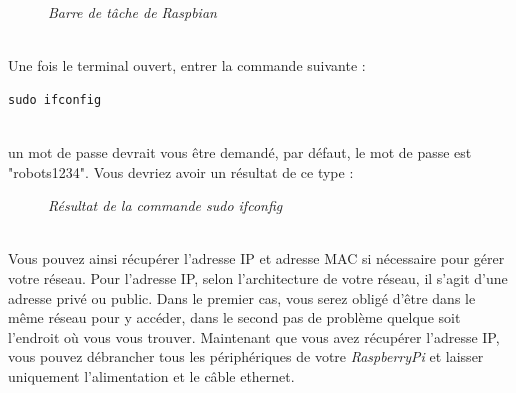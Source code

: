 \begin{enumerate}
\begin{figure}[H]
\begin{center}
\end{center}
	\caption{ \textit{Barre de tâche de Raspbian}}
\end{figure}\\

Une fois le terminal ouvert, entrer la commande suivante :
\begin{lstlisting}[style=MyBashStyle]
	sudo ifconfig
\end{lstlisting}\\

un mot de passe devrait vous être demandé, par défaut, le mot de passe est "robots1234".
Vous devriez avoir un résultat de ce type :\\

\begin{figure}[H]
\begin{center}
\end{center}
	\caption{ \textit{Résultat de la commande sudo ifconfig}}
\end{figure}\\

Vous pouvez ainsi récupérer l'adresse IP et adresse MAC si nécessaire pour gérer votre réseau. Pour l'adresse IP, selon l'architecture de votre réseau, il s'agit d'une adresse privé ou public. Dans le premier cas, vous serez obligé d'être dans le même réseau pour y accéder, dans le second pas de problème quelque soit l'endroit où vous vous trouver.
Maintenant que vous avez récupérer l'adresse IP, vous pouvez débrancher tous les périphériques de votre \textit{RaspberryPi} et laisser uniquement l'alimentation et le câble ethernet.


\end{enumerate}
